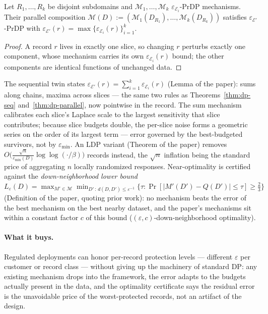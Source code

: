 \begin{lemma}\label{lem:dp-263-parallel}
Let $R_1,\dots,R_k$ be disjoint subdomains and $\mathcal{M}_1,\dots,\mathcal{M}_k$
$\varepsilon_{\mathcal{E}_i}$-PrDP mechanisms. Their parallel composition
$\mathcal{M}(D) := (\mathcal{M}_1(D_{R_1}),\dots,\mathcal{M}_k(D_{R_k}))$ satisfies
$\varepsilon_{\mathcal{E}'}$-PrDP with
$\varepsilon_{\mathcal{E}'}(r) = \max\{\varepsilon_{\mathcal{E}_i}(r)\}_{i=1}^k$. \eop
\end{lemma}

\begin{proof}
A record $r$ lives in exactly one slice, so changing $r$ perturbs exactly one component,
whose mechanism carries its own $\varepsilon_{\mathcal{E}_i}(r)$ bound; the other
components are identical functions of unchanged data.
\end{proof}

The sequential twin states
$\varepsilon_{\mathcal{E}'}(r) = \sum_{i=1}^k \varepsilon_{\mathcal{E}_i}(r)$ (Lemma
of the paper): sums along chains, maxima across slices --- the same two rules as
Theorems~\ref{thm:dp-seq} and~\ref{thm:dp-parallel}, now pointwise in the record. The
sum mechanism calibrates each slice's Laplace scale to the largest sensitivity that
slice contributes; because slice budgets double, the per-slice noise forms a geometric
series on the order of its largest term --- error governed by the best-budgeted
survivors, not by $\varepsilon_{\min}$. An LDP variant (Theorem of the paper) removes
$O\bigl(\tfrac{\sqrt n}{\varepsilon_{\min}(D)}\log\log(\cdot/\beta)\bigr)$ records
instead, the $\sqrt n$ inflation being the standard price of aggregating $n$ locally
randomized responses. Near-optimality is certified against the \emph{down-neighborhood
lower bound}
$L_\varepsilon(D) = \max_{M' \in \mathcal{M}} \min_{D'\,:\, d(D,D') \le
\varepsilon^{-1}} \{\tau : \Pr[|M'(D') - Q(D')| \le \tau] \ge \tfrac23\}$
(Definition of the paper, quoting prior work): no mechanism beats the error of the best
mechanism on the best nearby dataset, and the paper's mechanisms sit within a constant
factor $c$ of this bound ($(\varepsilon,c)$-down-neighborhood optimality).

\paragraph{What it buys.}
Regulated deployments can honor per-record protection levels --- different $\varepsilon$
per customer or record class --- without giving up the machinery of standard DP: any
existing mechanism drops into the framework, the error adapts to the budgets actually
present in the data, and the optimality certificate says the residual error is the
unavoidable price of the worst-protected records, not an artifact of the design.


